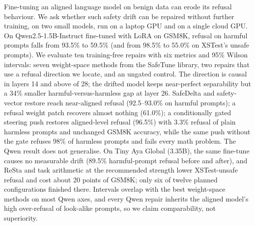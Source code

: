 Fine-tuning an aligned language model on benign data can erode its refusal behaviour. We ask whether such safety drift can be repaired without further training, on two small models, run on a laptop GPU and on a single cloud GPU. On Qwen2.5-1.5B-Instruct fine-tuned with LoRA on GSM8K, refusal on harmful prompts falls from 93.5\% to 59.5\% (and from 98.5\% to 55.0\% on XSTest's unsafe prompts). We evaluate ten training-free repairs with six metrics and 95\% Wilson intervals: seven weight-space methods from the SafeTune library, two repairs that use a refusal direction we locate, and an ungated control. The direction is causal in layers 14 and above of 28; the drifted model keeps near-perfect separability but a 34\% smaller harmful-versus-harmless gap at layer 26. SafeDelta and safety-vector restore reach near-aligned refusal (92.5--93.0\% on harmful prompts); a refusal weight patch recovers almost nothing (61.0\%); a conditionally gated steering push restores aligned-level refusal (96.5\%) with 3.3\% refusal of plain harmless prompts and unchanged GSM8K accuracy, while the same push without the gate refuses 98\% of harmless prompts and fails every math problem. The Qwen result does not generalise. On Tiny Aya Global (3.35B), the same fine-tune causes no measurable drift (89.5\% harmful-prompt refusal before and after), and ReSta and task arithmetic at the recommended strength lower XSTest-unsafe refusal and cost about 20 points of GSM8K; only six of twelve planned configurations finished there. Intervals overlap with the best weight-space methods on most Qwen axes, and every Qwen repair inherits the aligned model's high over-refusal of look-alike prompts, so we claim comparability, not superiority.
